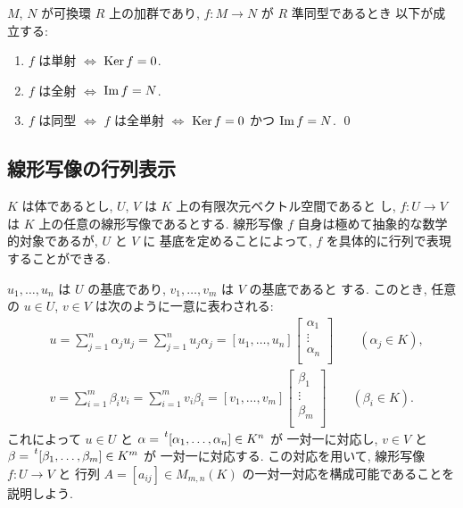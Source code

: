\documentclass[12pt,twoside]{jarticle}
\begin{document}
\begin{summary}
  $M$, $N$ が可換環 $R$ 上の加群であり, $f:M\to N$ が $R$ 準同型であるとき
  以下が成立する:
  \begin{enumerate}
  \item $f$ は単射 $\iff$ $\mathop{\mathrm{Ker}}\nolimits f = 0$.
  \item $f$ は全射 $\iff$ $\mathop{\mathrm{Im}}\nolimits f = N$.
  \item $f$ は同型 $\iff$ $f$ は全単射
    $\iff$ $\mathop{\mathrm{Ker}}\nolimits f = 0$ かつ $\mathop{\mathrm{Im}}\nolimits f = N$.
    \qed
  \end{enumerate}
\end{summary}


\subsection{線形写像の行列表示}
\label{sec:matrix-rep}

$K$ は体であるとし, $U$, $V$ は $K$ 上の有限次元ベクトル空間であると
し, $f:U\to V$ は $K$ 上の任意の線形写像であるとする. 
線形写像 $f$ 自身は極めて抽象的な数学的対象であるが, $U$ と $V$ に
基底を定めることによって, $f$ を具体的に行列で表現することができる. 

$u_1,\ldots,u_n$ は $U$ の基底であり, $v_1,\ldots,v_m$ は $V$ の基底であると
する. このとき, 任意の $u\in U$, $v\in V$ は次のように一意に表わされる:
\begin{align*}
  &
  u 
  = \sum_{j=1}^n \alpha_j u_j 
  = \sum_{j=1}^n u_j \alpha_j
  =
  [u_1,\ldots,u_n]
  \begin{bmatrix}
    \alpha_1 \\
    \vdots \\
    \alpha_n \\
  \end{bmatrix}
  \qquad (\alpha_j\in K),
  \\ &
  v
  = \sum_{i=1}^m \beta_i v_i 
  = \sum_{i=1}^m v_i \beta_i 
  =
  [v_1,\ldots,v_m]
  \begin{bmatrix}
    \beta_1 \\
    \vdots \\
    \beta_m \\
  \end{bmatrix}
  \qquad (\beta_i\in K).
\end{align*}
これによって $u\in U$ と $\alpha=\tp{[\alpha_1,\ldots,\alpha_n]}\in K^n$ が
一対一に対応し, $v\in V$ と $\beta=\tp{[\beta_1,\ldots,\beta_m]}\in K^m$ が
一対一に対応する.
この対応を用いて, 線形写像 $f:U\to V$ と
行列 $A=[a_{ij}]\in M_{m,n}(K)$ の一対一対応を構成可能であることを
説明しよう.
\end{document}
